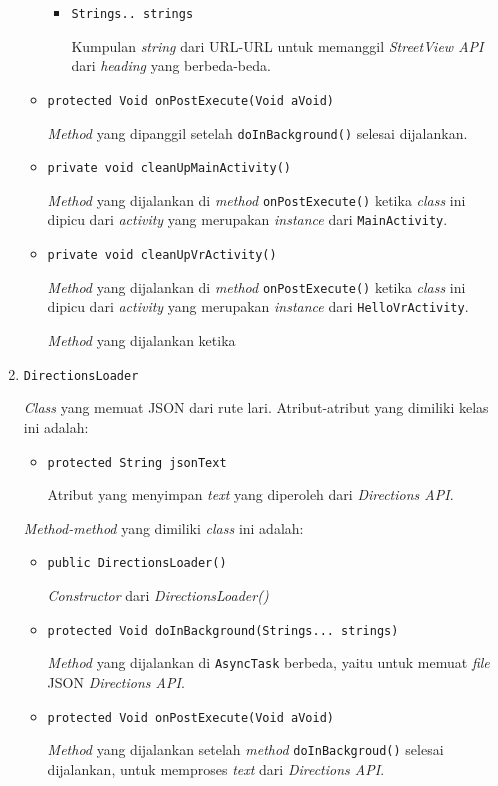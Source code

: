 \begin{enumerate}
\begin{itemize}
		\begin{itemize}
			\item \texttt{Strings.. strings}
			
			Kumpulan \textit{string} dari URL-URL untuk memanggil \textit{StreetView API} dari \textit{heading} yang berbeda-beda.
		\end{itemize}				
		 
		\item \texttt{protected Void onPostExecute(Void aVoid)}
		
		\textit{Method} yang dipanggil setelah \texttt{doInBackground()} selesai dijalankan.
		\item \texttt{private void cleanUpMainActivity()}
		
		\textit{Method} yang dijalankan di \textit{method} \texttt{onPostExecute()} ketika \textit{class} ini dipicu dari \textit{activity} yang merupakan \textit{instance} dari \texttt{MainActivity}.
		\item \texttt{private void cleanUpVrActivity()}
		
		\textit{Method} yang dijalankan di \textit{method} \texttt{onPostExecute()} ketika \textit{class} ini dipicu dari \textit{activity} yang merupakan \textit{instance} dari \texttt{HelloVrActivity}.
		
		\textit{Method} yang dijalankan ketika 
	\end{itemize}
	
	\item \texttt{DirectionsLoader}
	
	\textit{Class} yang memuat JSON dari rute lari. Atribut-atribut yang dimiliki kelas ini adalah:
	\begin{itemize}
		\item \texttt{protected String jsonText}
		
		Atribut yang menyimpan \textit{text} yang diperoleh dari \textit{Directions API}.
	\end{itemize}
	
	\textit{Method-method} yang dimiliki \textit{class} ini adalah:
	
	\begin{itemize}
		\item \texttt{public DirectionsLoader()}
		
		\textit{Constructor} dari \textit{DirectionsLoader()}	
		\item \texttt{protected Void doInBackground(Strings... strings)}
		
		\textit{Method} yang dijalankan di \texttt{AsyncTask} berbeda, yaitu untuk memuat \textit{file} JSON \textit{Directions API}.
		\item \texttt{protected Void onPostExecute(Void aVoid)}
		
		\textit{Method} yang dijalankan setelah \textit{method} \texttt{doInBackgroud()} selesai dijalankan, untuk memproses \textit{text} dari \textit{Directions API}. 
	\end{itemize} 
\end{enumerate} 


